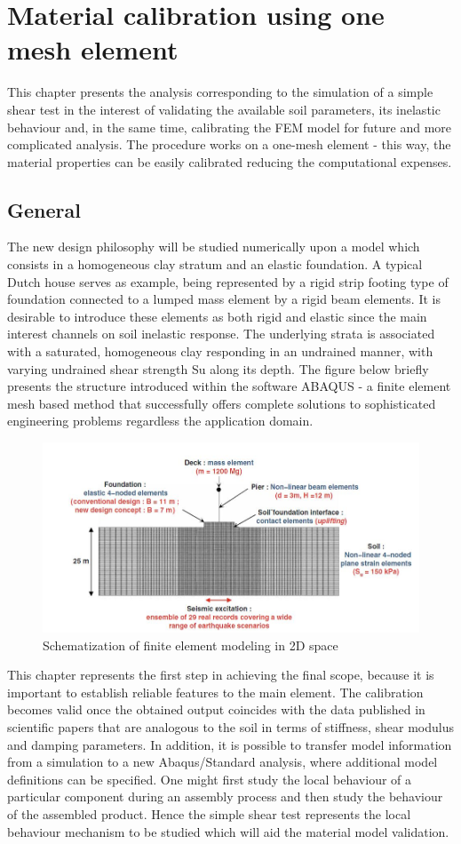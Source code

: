 \documentclass[10pt,a4paper]{report}
\begin{document}
\chapter{Material calibration using one mesh element}\label{ch3}
This chapter presents the analysis corresponding to the simulation of a simple shear test in the interest of validating the available soil parameters, its inelastic behaviour and, in the same time, calibrating the FEM model for future and more complicated analysis. The procedure works on a one-mesh element - this way, the material properties can be easily calibrated reducing the computational expenses. 

\section{General}
The new design philosophy will be studied numerically upon a model which consists in a homogeneous clay stratum and an elastic foundation.  A typical Dutch house serves as example, being represented by a rigid strip footing type of foundation connected to a lumped mass element by a rigid beam elements. It is desirable to introduce these elements as both rigid and elastic since the main interest channels on soil inelastic response. The underlying strata is associated with a saturated, homogeneous clay responding in an undrained manner, with varying undrained shear strength Su along its depth. The figure below briefly presents the structure introduced within the software ABAQUS - a finite element mesh based method that successfully offers complete solutions to sophisticated engineering problems regardless the application domain.

\begin{figure}[h!]
	\centering
	\includegraphics[width=0.8\linewidth]{"scheme2D"}
	\caption{Schematization of finite element modeling in 2D space}
	\label{FEM2d}
\end{figure}

This chapter represents the first step in achieving the final scope, because it is important to establish reliable features to the main element. The calibration becomes valid once the obtained output coincides with the data published in scientific papers that are analogous to the soil in terms of stiffness, shear modulus and damping parameters. In addition, it is possible to transfer model information from a simulation to a new Abaqus/Standard analysis, where additional model definitions can be specified. One might first study the local behaviour of a particular component during an assembly process and then study the behaviour of the assembled product. Hence the simple shear test represents the local behaviour mechanism to be studied which will aid the material model validation. 
\end{document}
